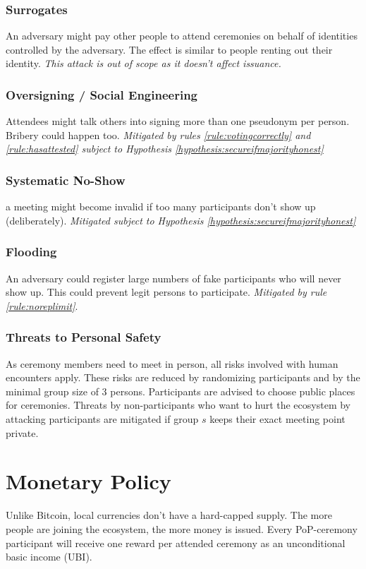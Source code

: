 \documentclass[conference]{IEEEtran}
\begin{document}
\subsubsection{Surrogates}
An adversary might pay other people to attend ceremonies on behalf of identities controlled by the adversary. The effect is similar to people renting out their identity. \emph{This attack is out of scope as it doesn't affect issuance.}
\subsubsection{Oversigning / Social Engineering}
Attendees might talk others into signing more than one pseudonym per person. Bribery could happen too. \emph{Mitigated by rules \ref{rule:votingcorrectly} and \ref{rule:hasattested} subject to Hypothesis \ref{hypothesis:secureifmajorityhonest}}
\subsubsection{Systematic No-Show}
a meeting might become invalid if too many participants don't show up (deliberately). \emph{Mitigated subject to Hypothesis \ref{hypothesis:secureifmajorityhonest}} 
\subsubsection{Flooding}
An adversary could register large numbers of fake participants who will never show up. This could prevent legit persons to participate.
 \textit{Mitigated by rule \ref{rule:noreplimit}}.
\subsubsection{Threats to Personal Safety}\label{safetythreat}
As ceremony members need to meet in person, all risks involved with human encounters apply. These risks are reduced by randomizing participants and by the minimal group size of 3 persons. Participants are advised to choose public places for ceremonies.
Threats by non-participants who want to hurt the \encointer ecosystem by attacking participants are mitigated if group $s$ keeps their exact meeting point private. 

\section{Monetary Policy}
Unlike Bitcoin, \encointer local currencies don't have a hard-capped supply. The more people are joining the ecosystem, the more money is issued. Every PoP-ceremony participant will receive one reward per attended ceremony as an unconditional basic income (UBI). 
\end{document}

